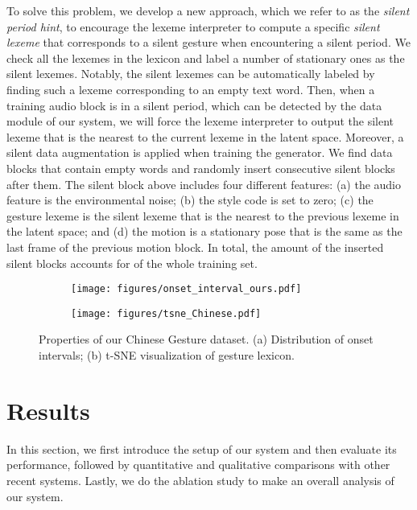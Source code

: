 \documentclass[acmtog,authorversion]{acmart}
\begin{document}
To solve this problem, we develop a new approach, which we refer to as the \emph{silent period hint}, to encourage the lexeme interpreter to compute a specific \emph{silent lexeme} that corresponds to a silent gesture when encountering a silent period. 
We check all the lexemes in the lexicon and label a number of stationary ones as the silent lexemes. Notably, the silent lexemes can be automatically labeled by finding such a lexeme corresponding to an empty text word. Then, when a training audio block is in a silent period, which can be detected by the data module of our system, we will force the lexeme interpreter to output the silent lexeme that is the nearest to the current lexeme in the latent space.
Moreover, a silent data augmentation is applied when training the generator. We find data blocks that contain empty words and randomly insert  consecutive silent blocks after them. The silent block above includes four different features: (a) the audio feature is the environmental noise; (b) the style code is set to zero; (c) the gesture lexeme is the silent lexeme that is the nearest to the previous lexeme in the latent space; and (d) the motion is a stationary pose that is the same as the last frame of the previous motion block. In total, the amount of the inserted silent blocks accounts for  of the whole training set. \begin{figure}[t]
    \centering   
    \begin{subfigure}[t]{0.433\linewidth}
         \centering
         \texttt{[image: figures/onset\_interval\_ours.pdf]}
         \caption{}
         \label{fig:onset_intervals_Chinese}
    \end{subfigure}
    \hspace{0.06\linewidth}
    \begin{subfigure}[t]{0.40\linewidth}
         \centering
         \texttt{[image: figures/tsne\_Chinese.pdf]}
         \caption{}
         \label{fig:lexicon_tsne_Chinese}
    \end{subfigure}
    \caption{Properties of our Chinese Gesture dataset. (a) Distribution of onset intervals; (b) t-SNE visualization of gesture lexicon.} 
    \Description{}
\end{figure}

\section{Results}
\label{sec:results}
In this section, we first introduce the setup of our system and then evaluate its performance, followed by quantitative and qualitative comparisons with other recent systems. Lastly, we do the ablation study to make an overall analysis of our system.
\end{document}

